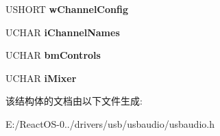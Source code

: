 \begin{DoxyCompactItemize}
\mbox{\label{struct_u_s_b___a_u_d_i_o___c_o_n_t_r_o_l___m_i_x_e_r___u_n_i_t___d_e_s_c_r_i_p_t_o_r_af6be66f6a5cab4e92a7abc003bf7edf3}} 
U\+S\+H\+O\+RT {\bfseries w\+Channel\+Config}
\item 
\mbox{\label{struct_u_s_b___a_u_d_i_o___c_o_n_t_r_o_l___m_i_x_e_r___u_n_i_t___d_e_s_c_r_i_p_t_o_r_aa2a0356d39dbb736272efc494bef9824}} 
U\+C\+H\+AR {\bfseries i\+Channel\+Names}
\item 
\mbox{\label{struct_u_s_b___a_u_d_i_o___c_o_n_t_r_o_l___m_i_x_e_r___u_n_i_t___d_e_s_c_r_i_p_t_o_r_aebf5f0c0201078f6ecd2a509c878785d}} 
U\+C\+H\+AR {\bfseries bm\+Controls}
\item 
\mbox{\label{struct_u_s_b___a_u_d_i_o___c_o_n_t_r_o_l___m_i_x_e_r___u_n_i_t___d_e_s_c_r_i_p_t_o_r_ac7f21238fc8f6adf52abf8c17ac92532}} 
U\+C\+H\+AR {\bfseries i\+Mixer}
\end{DoxyCompactItemize}


该结构体的文档由以下文件生成\+:\begin{DoxyCompactItemize}
\item 
E\+:/\+React\+O\+S-\/0../drivers/usb/usbaudio/usbaudio.\+h\end{DoxyCompactItemize}
